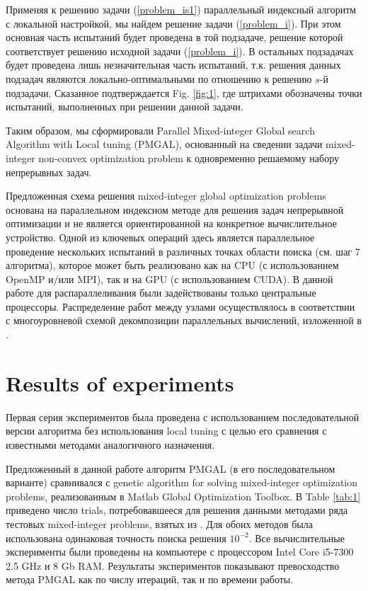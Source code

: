 \documentclass[
11pt,%
tightenlines,%
twoside,%
onecolumn,%
nofloats,%
nobibnotes,%
nofootinbib,%
superscriptaddress,%
noshowpacs,%
centertags]%
{revtex4}
\begin{document}
Применяя к решению задачи (\ref{problem_is1}) параллельный индексный алгоритм с локальной настройкой, мы найдем решение задачи (\ref{problem_i}). При этом основная часть испытаний будет проведена в той подзадаче, решение которой соответствует решению исходной задачи (\ref{problem_i}). В остальных подзадачах будет проведена лишь незначительная часть испытаний, т.к. решения данных подзадач являются локально-оптимальными по отношению к решению $s$-й подзадачи. Сказанное подтверждается Fig. \ref{fig:1}, где штрихами обозначены точки испытаний, выполненных при решении данной задачи.

Таким образом, мы сформировали Parallel Mixed-integer Global search Algorithm with Local tuning (PMGAL), основанный на сведении задачи mixed-integer non-convex optimization problem к одновременно решаемому набору непрерывных задач.

Предложенная схема решения mixed-integer global optimization problems основана на параллельном индексном методе для решения задач непрерывной оптимизации и не является ориентированной на конкретное вычислительное устройство. Одной из ключевых операций здесь является параллельное проведение нескольких испытаний в различных точках области поиска (см. шаг 7 алгоритма), которое может быть реализовано как на CPU (с использованием OpenMP и/или MPI), так и на GPU (с использованием CUDA). 
В данной работе для распараллеливания были задействованы только центральные процессоры. Распределение работ между узлами осуществлялось в соответствии с многоуровневой схемой декомпозиции параллельных вычислений, изложенной в \cite{Strongin2018,Barkalov2020}.

\section{Results of experiments}


Первая серия экспериментов была проведена с использованием последовательной версии алгоритма без использования local tuning с целью его сравнения с известными методами аналогичного назначения.

Предложенный в данной работе алгоритм PMGAL (в его последовательном варианте) сравнивался с genetic algorithm for solving mixed-integer optimization problems, реализованным в Matlab Global Optimization Toolbox. В Table \ref{tab:1} приведено число trials, потребовавшееся для решения данными методами ряда тестовых mixed-integer problems, взятых из \cite{Deep,Floudas}. Для обоих методов была использована одинаковая точность поиска решения $10^{-2}$. Все вычислительные эксперименты были проведены на компьютере с процессором Intel Core i5-7300 2.5 GHz и 8 Gb RAM. Результаты экспериментов показывают превосходство метода PMGAL как по числу итераций, так и по времени работы.
\end{document}
